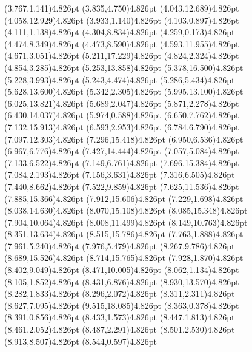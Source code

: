 \documentclass[10pt]{article}
\begin{document}
{{\qdisk(3.767,1.141){4.826pt}%
\qdisk(3.835,4.750){4.826pt}%
\qdisk(4.043,12.689){4.826pt}%
\qdisk(4.058,12.929){4.826pt}%
\qdisk(3.933,1.140){4.826pt}%
\qdisk(4.103,0.897){4.826pt}%
\qdisk(4.111,1.138){4.826pt}%
\qdisk(4.304,8.834){4.826pt}%
\qdisk(4.259,0.173){4.826pt}%
\qdisk(4.474,8.349){4.826pt}%
\qdisk(4.473,8.590){4.826pt}%
\qdisk(4.593,11.955){4.826pt}%
\qdisk(4.671,3.051){4.826pt}%
\qdisk(5.211,17.229){4.826pt}%
\qdisk(4.824,2.324){4.826pt}%
\qdisk(4.854,3.285){4.826pt}%
\qdisk(5.253,13.858){4.826pt}%
\qdisk(5.378,16.500){4.826pt}%
\qdisk(5.228,3.993){4.826pt}%
\qdisk(5.243,4.474){4.826pt}%
\qdisk(5.286,5.434){4.826pt}%
\qdisk(5.628,13.600){4.826pt}%
\qdisk(5.342,2.305){4.826pt}%
\qdisk(5.995,13.100){4.826pt}%
\qdisk(6.025,13.821){4.826pt}%
\qdisk(5.689,2.047){4.826pt}%
\qdisk(5.871,2.278){4.826pt}%
\qdisk(6.430,14.037){4.826pt}%
\qdisk(5.974,0.588){4.826pt}%
\qdisk(6.650,7.762){4.826pt}%
\qdisk(7.132,15.913){4.826pt}%
\qdisk(6.593,2.953){4.826pt}%
\qdisk(6.784,6.790){4.826pt}%
\qdisk(7.097,12.303){4.826pt}%
\qdisk(7.296,15.418){4.826pt}%
\qdisk(6.950,6.536){4.826pt}%
\qdisk(6.967,6.776){4.826pt}%
\qdisk(7.427,14.444){4.826pt}%
\qdisk(7.057,5.084){4.826pt}%
\qdisk(7.133,6.522){4.826pt}%
\qdisk(7.149,6.761){4.826pt}%
\qdisk(7.696,15.384){4.826pt}%
\qdisk(7.084,2.193){4.826pt}%
\qdisk(7.156,3.631){4.826pt}%
\qdisk(7.316,6.505){4.826pt}%
\qdisk(7.440,8.662){4.826pt}%
\qdisk(7.522,9.859){4.826pt}%
\qdisk(7.625,11.536){4.826pt}%
\qdisk(7.885,15.366){4.826pt}%
\qdisk(7.912,15.606){4.826pt}%
\qdisk(7.229,1.698){4.826pt}%
\qdisk(8.038,14.630){4.826pt}%
\qdisk(8.070,15.108){4.826pt}%
\qdisk(8.085,15.348){4.826pt}%
\qdisk(7.904,10.064){4.826pt}%
\qdisk(8.008,11.499){4.826pt}%
\qdisk(8.149,10.763){4.826pt}%
\qdisk(8.351,13.634){4.826pt}%
\qdisk(8.515,15.786){4.826pt}%
\qdisk(7.763,1.888){4.826pt}%
\qdisk(7.961,5.240){4.826pt}%
\qdisk(7.976,5.479){4.826pt}%
\qdisk(8.267,9.786){4.826pt}%
\qdisk(8.689,15.526){4.826pt}%
\qdisk(8.714,15.765){4.826pt}%
\qdisk(7.928,1.870){4.826pt}%
\qdisk(8.402,9.049){4.826pt}%
\qdisk(8.471,10.005){4.826pt}%
\qdisk(8.062,1.134){4.826pt}%
\qdisk(8.105,1.852){4.826pt}%
\qdisk(8.431,6.876){4.826pt}%
\qdisk(8.930,13.570){4.826pt}%
\qdisk(8.282,1.833){4.826pt}%
\qdisk(8.296,2.072){4.826pt}%
\qdisk(8.311,2.311){4.826pt}%
\qdisk(8.627,7.095){4.826pt}%
\qdisk(9.515,18.085){4.826pt}%
\qdisk(8.363,0.378){4.826pt}%
\qdisk(8.391,0.856){4.826pt}%
\qdisk(8.433,1.573){4.826pt}%
\qdisk(8.447,1.813){4.826pt}%
\qdisk(8.461,2.052){4.826pt}%
\qdisk(8.487,2.291){4.826pt}%
\qdisk(8.501,2.530){4.826pt}%
\qdisk(8.913,8.507){4.826pt}%
\qdisk(8.544,0.597){4.826pt}%
}}
\end{document}
